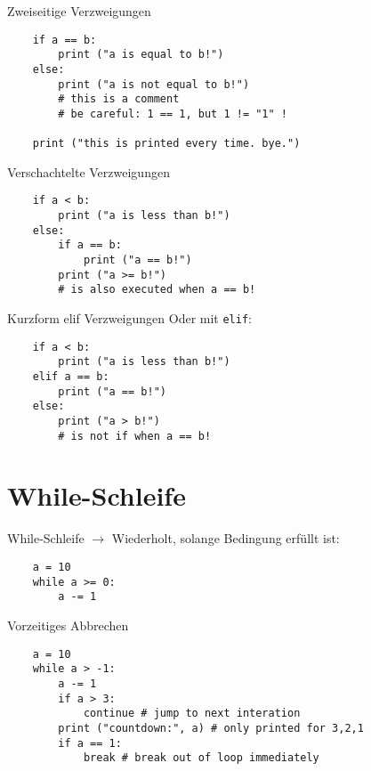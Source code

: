 \begin{frame}[fragile]{Zweiseitige Verzweigungen}
    \begin{lstlisting}
    if a == b:
        print ("a is equal to b!")
    else:
        print ("a is not equal to b!")
        # this is a comment
        # be careful: 1 == 1, but 1 != "1" !
    
    print ("this is printed every time. bye.")
    \end{lstlisting}
\end{frame}

\begin{frame}[fragile]{Verschachtelte Verzweigungen}
    \begin{lstlisting}
    if a < b:
        print ("a is less than b!")
    else:
        if a == b:
            print ("a == b!")
        print ("a >= b!")
        # is also executed when a == b! 
    \end{lstlisting}
\end{frame}

\begin{frame}[fragile]{Kurzform elif Verzweigungen}
    Oder mit \texttt{elif}:
    \begin{lstlisting}
    if a < b:
        print ("a is less than b!")
    elif a == b:
        print ("a == b!")
    else:
        print ("a > b!")
        # is not if when a == b! 
    \end{lstlisting}
\end{frame}

\section{While-Schleife}

\begin{frame}[fragile]{While-Schleife}
    $\rightarrow$ Wiederholt, solange Bedingung erfüllt ist:
    \begin{lstlisting}
    a = 10
    while a >= 0:
        a -= 1
    \end{lstlisting}
\end{frame}

\begin{frame}[fragile]{Vorzeitiges Abbrechen} 
    \begin{lstlisting}
    a = 10
    while a > -1:
        a -= 1
        if a > 3:
            continue # jump to next interation
        print ("countdown:", a) # only printed for 3,2,1
        if a == 1:
            break # break out of loop immediately
    \end{lstlisting}
\end{frame}

